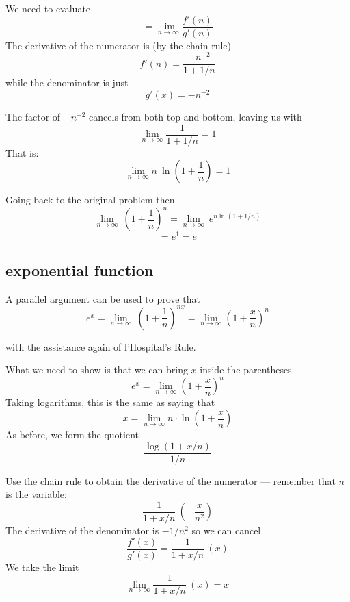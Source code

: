 \documentclass[11pt, oneside]{article}
\begin{document}
We need to evaluate
\[ = \lim_{n \rightarrow \infty} \frac{f'(n)}{g'(n)} \]
The derivative of the numerator is (by the chain rule)
\[ f'(n) = \frac{-n^{-2}}{1 + 1/n} \]
while the denominator is just
\[ g'(x) = -n^{-2} \]

The factor of $-n^{-2}$ cancels from both top and bottom, leaving us with
\[ \lim_{n \rightarrow \infty} \frac{1}{1 + 1/n} = 1  \]
That is:
\[ \lim_{n \rightarrow \infty} n \ \ln (1 + \frac{1}{n}) = 1 \]

Going back to the original problem then
\[ \lim_{n \rightarrow \infty} \ (1 + \frac{1}{n})^n = \lim_{n \rightarrow \infty} \  e^{n \ln(1 + 1/n)} \]
\[ = e^1 = e \]

\subsection*{exponential function}

A parallel argument can be used to prove that
\[ e^x = \lim_{n \rightarrow \infty} \ (1 + \frac{1}{n})^{nx} = \lim_{n \to \infty} (1 + \frac{x}{n})^{n} \]

with the assistance again of l'Hospital's Rule.  
 
 What we need to show is that we can bring $x$ inside the parentheses
\[ e^x =  \lim_{n \to \infty} (1 + \frac{x}{n})^{n} \]
Taking logarithms, this is the same as saying that
\[ x =  \lim_{n \to \infty} n \cdot \ln (1 + \frac{x}{n} ) \]
As before, we form the quotient
\[ \frac{\log (1 + x/n)}{1/n} \]

Use the chain rule to obtain the derivative of the numerator --- remember that $n$ is the variable:
\[ \frac{1}{1 + x/n} \ (- \frac{x}{n^2}) \]
The derivative of the denominator is $-1/n^2$ so we can cancel
\[ \frac{f'(x)}{g'(x)} = \frac{1}{1 + x/n} \ (x) \]
We take the limit
\[ \lim_{n \to \infty} \frac{1}{1 + x/n} \ (x)  = x \]
\end{document}

